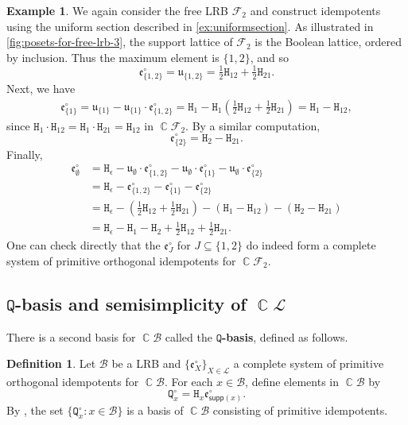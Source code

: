 \documentclass[11pt, oneside, reqno]{amsart}
\theoremstyle{definition}
\newtheorem{definition}[theorem]{Definition}
\newtheorem{example}[theorem]{Example}
\numberwithin{equation}{section}
\DeclareMathOperator{\C}{\mathbb{C}}
\newcommand{\defn}[1]{{\color{RoyalBlue}\bf#1}}
\def \BB{{\mathcal{B}}}
\def \kk{\C}
\def \lat{{\mathcal{L}}}
\def \uu{{\mathfrak{u}}}
\def \ee{{\mathfrak{e}}}
\def \supp{\mathsf{supp}}
\newcommand{\B}[1]{\mathtt{#1}} 			%
\begin{document}
\begin{example}
We again consider the free LRB $\mathscr{F}_2$ and construct idempotents using the uniform section described in \cref{ex:uniformsection}.
As illustrated in \cref{fig:posets-for-free-lrb-3}, the support lattice of $\mathscr{F}_2$ is the Boolean lattice, ordered by inclusion.
Thus the maximum element is $\{ 1,2 \}$, and so
\[ \ee^\circ_{\{ 1,2 \}} = \uu_{\{ 1,2 \}} = \tfrac{1}{2} \B{H}_{12} + \tfrac{1}{2} \B{H}_{21}.\]
Next, we have
\begin{align*}
    \ee^\circ_{\{ 1 \}} =  \uu_{\{ 1 \}} -  \uu_{\{ 1 \}} \cdot \ee^\circ_{\{ 1,2 \}}
    = \B{H}_{1} - \B{H}_1 \left( \tfrac{1}{2} \B{H}_{12} + \tfrac{1}{2} \B{H}_{21} \right)
    = \B{H}_1 - \B{H}_{12}, 
\end{align*}
since $\B{H}_1 \cdot \B{H}_{12}  = \B{H}_1 \cdot \B{H}_{21}  = \B{H}_{12}$ in $\kk \mathscr{F}_2$.
By a similar computation,
\[ \ee^\circ_{\{ 2 \}} = \B{H}_2 - \B{H}_{21}.\]
Finally,
\begin{align*}
    \ee^\circ_{\emptyset} &= \B{H}_{\epsilon} - \uu_{\emptyset} \cdot \ee^\circ_{\{ 1, 2 \}} -  \uu_{\emptyset} \cdot \ee^\circ_{\{ 1 \}} -  \uu_{\emptyset} \cdot \ee^\circ_{\{ 2 \}} \\
    &= \B{H}_{\epsilon} -  \ee^\circ_{\{ 1, 2 \}} -   \ee^\circ_{\{ 1 \}} -  \ee^\circ_{\{ 2 \}} \\
    &= \B{H}_{\epsilon}- \left( \tfrac{1}{2} \B{H}_{12} + \tfrac{1}{2} \B{H}_{21} \right) - \left( \B{H}_1 - \B{H}_{12} \right) - \left( \B{H}_2 - \B{H}_{21} \right)\\
    &= \B{H}_{\epsilon} - \B{H}_{1} - \B{H}_{2} + \tfrac{1}{2} \B{H}_{12} + \tfrac{1}{2} \B{H}_{21}.
\end{align*}
One can check directly that the $\ee^\circ_{J}$ for $J \subseteq \{ 1,2 \}$ do indeed form a complete system of primitive orthogonal idempotents
for $\kk \mathscr{F}_2$.
\end{example}

\subsection{$\B{Q}$-basis and semisimplicity of $\C \lat$}
\label{sec:LRB-Q-basis}

There is a second basis for $\kk\BB$ called the \defn{$\B{Q}$-basis}, defined as follows.
\begin{definition}\label{def:qbasis}
    \label{prop:LRB-Q-Basis}
    Let $\BB$ be a LRB and $\{\ee^\circ_X\}_{X \in \lat}$
    a complete system of primitive orthogonal idempotents for
    $\kk \BB$.
    For each $x \in \BB$, define elements in $\kk \BB$ by
    \begin{equation} \label{eq:LRB-Q-basis}
        \B{Q}^\circ_x = \B{H}_{x} \ee^\circ_{\supp(x)}.
    \end{equation}
By \cite[Proposition 5.4]{saliola2009face},
the set
$\{\B{Q}^\circ_x : x \in \BB\}$ is a basis of $\kk \BB$
consisting of primitive idempotents.
\end{definition}
\end{document}
